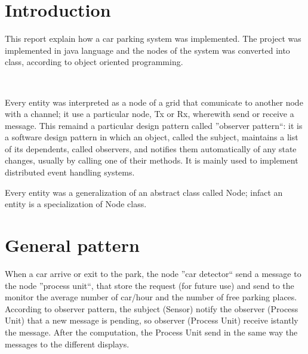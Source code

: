 \documentclass[a4paper,titlepage]{article}
\begin{document}
\begin{frontespizio}


\end{frontespizio}


\newpage

\part{Introduction}

This report explain how a car parking system was implemented. The project was implemented in java language and the nodes of the system was converted into class, according to object oriented programming. 

~

Every entity was interpreted as a node of a grid that comunicate to another node with a channel; it use a particular node, Tx or Rx, wherewith send or receive a message. This remaind a particular design pattern called ''observer pattern``: it is a software design pattern in which an object, called the subject, maintains a list of its dependents, called observers, and notifies them automatically of any state changes, usually by calling one of their methods. It is mainly used to implement distributed event handling systems.

Every entity was a generalization of an abstract class called Node; infact an entity is a specialization of Node class.


\part{General pattern}

When a car arrive or exit to the park, the node ''car detector`` send a message to the node ''process unit``, that store the request (for future use) and send to the monitor the average number of car/hour and the number of free parking places. According to observer pattern, the subject (Sensor) notify the observer (Process Unit) that a new message is pending, so observer (Process Unit) receive istantly the message. After the computation, the Process Unit send in the same way the messages to the different displays.
\end{document}
